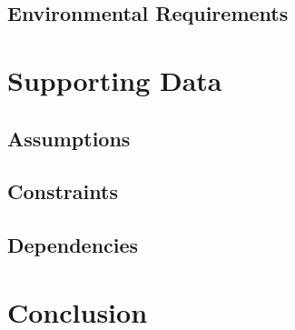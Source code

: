 \documentclass{article}
\begin{document}
\subsection{Environmental Requirements}
\section{Supporting Data}
\subsection{Assumptions}
\subsection{Constraints}
\subsection{Dependencies}
\section{Conclusion}
\end{document}
